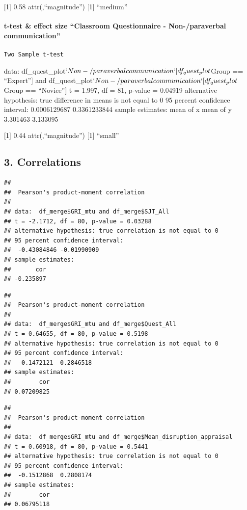 \documentclass[
]{article}
\begin{document}
{[}1{]} 0.58 attr(,``magnitude'') {[}1{]} ``medium''

\paragraph{t-test \& effect size ``Classroom Questionnaire -
Non-/paraverbal
communication''}\label{t-test-effect-size-classroom-questionnaire---non-paraverbal-communication}

\begin{verbatim}
Two Sample t-test
\end{verbatim}

data:
df\_quest\_plot\(`Non-/paraverbal communication`[df_quest_plot\)Group ==
``Expert''{]} and
df\_quest\_plot\(`Non-/paraverbal communication`[df_quest_plot\)Group ==
``Novice''{]} t = 1.997, df = 81, p-value = 0.04919 alternative
hypothesis: true difference in means is not equal to 0 95 percent
confidence interval: 0.0006129687 0.3361233844 sample estimates: mean of
x mean of y 3.301463 3.133095

{[}1{]} 0.44 attr(,``magnitude'') {[}1{]} ``small''

\subsection{3. Correlations}\label{correlations}

\begin{verbatim}
## 
##  Pearson's product-moment correlation
## 
## data:  df_merge$GRI_mtu and df_merge$SJT_All
## t = -2.1712, df = 80, p-value = 0.03288
## alternative hypothesis: true correlation is not equal to 0
## 95 percent confidence interval:
##  -0.43084846 -0.01990909
## sample estimates:
##       cor 
## -0.235897
\end{verbatim}

\begin{verbatim}
## 
##  Pearson's product-moment correlation
## 
## data:  df_merge$GRI_mtu and df_merge$Quest_All
## t = 0.64655, df = 80, p-value = 0.5198
## alternative hypothesis: true correlation is not equal to 0
## 95 percent confidence interval:
##  -0.1472121  0.2846518
## sample estimates:
##        cor 
## 0.07209825
\end{verbatim}

\begin{verbatim}
## 
##  Pearson's product-moment correlation
## 
## data:  df_merge$GRI_mtu and df_merge$Mean_disruption_appraisal
## t = 0.60918, df = 80, p-value = 0.5441
## alternative hypothesis: true correlation is not equal to 0
## 95 percent confidence interval:
##  -0.1512868  0.2808174
## sample estimates:
##        cor 
## 0.06795118
\end{verbatim}
\end{document}
